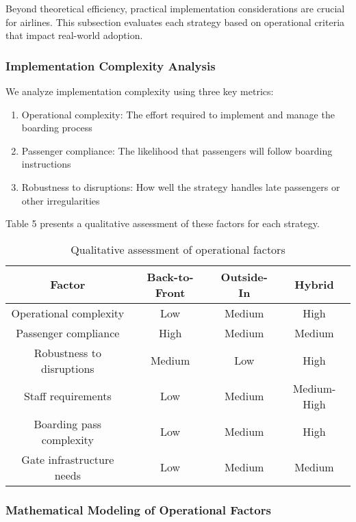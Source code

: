 Beyond theoretical efficiency, practical implementation considerations are crucial for airlines. This subsection evaluates each strategy based on operational criteria that impact real-world adoption.

\subsubsection{Implementation Complexity Analysis}

We analyze implementation complexity using three key metrics:

\begin{enumerate}
    \item Operational complexity: The effort required to implement and manage the boarding process
    \item Passenger compliance: The likelihood that passengers will follow boarding instructions
    \item Robustness to disruptions: How well the strategy handles late passengers or other irregularities
\end{enumerate}

Table 5 presents a qualitative assessment of these factors for each strategy.

\begin{table}[h]
\centering
\begin{tabular}{|c|c|c|c|}
\hline
\textbf{Factor} & \textbf{Back-to-Front} & \textbf{Outside-In} & \textbf{Hybrid} \\
\hline
Operational complexity & Low & Medium & High \\
\hline
Passenger compliance & High & Medium & Medium \\
\hline
Robustness to disruptions & Medium & Low & High \\
\hline
Staff requirements & Low & Medium & Medium-High \\
\hline
Boarding pass complexity & Low & Medium & High \\
\hline
Gate infrastructure needs & Low & Medium & Medium \\
\hline
\end{tabular}
\caption{Qualitative assessment of operational factors}
\label{tab:operational}
\end{table}

\subsubsection{Mathematical Modeling of Operational Factors}

